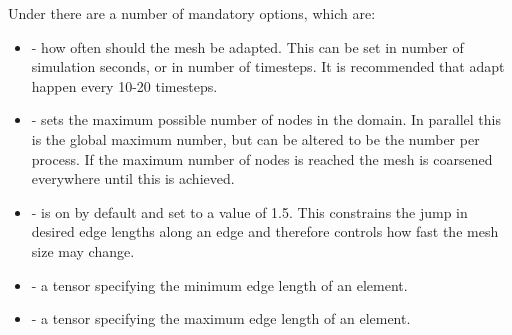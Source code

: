 Under  there are a number of mandatory options, which are:
\begin{itemize}
\item {} - how often should the mesh be adapted. This can be set in number of simulation seconds, 
or in number of timesteps. It is recommended that adapt happen every 10-20 timesteps.
\item {} - sets the maximum possible number of nodes in the domain. In parallel this is the
global maximum number, but can be altered to be the number per process. If the maximum number of nodes is reached the mesh is coarsened everywhere until this is achieved.
\item {} - is on by default and set to a value of 1.5. This constrains the jump in desired edge lengths along an edge and therefore controls how fast the mesh size may change.
\item {} - a tensor specifying the minimum edge length of an element.
\item {} - a tensor specifying the maximum edge length of an element.
\end{itemize}

